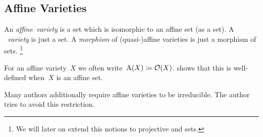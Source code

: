 \subsection{Affine Varieties}


\begin{definition}
  An \emph{affine~variety} is a {\qaffine} set which is isomorphic to an affine set (as a {\qaffine} set).
  A \emph{{\qaffine}~variety} is just a {\qaffine} set.
  A \emph{morphism} of (quasi-)affine varieties is just a morphism of {\qaffine} sets.%
  \footnote{We will later on extend this notions to projective and {\qprojective} sets.}
\end{definition}


\begin{notation}
  For an affine variety~$X$ we often write~$\operatorname{A}(X) \coloneqq \mathcal{O}(X)$.
   shows that this is well-defined when~$X$ is an affine set.
\end{notation}


\begin{remark}
  Many authors additionally require affine varieties to be irreducible.
  The author tries to avoid this restriction.
\end{remark}


